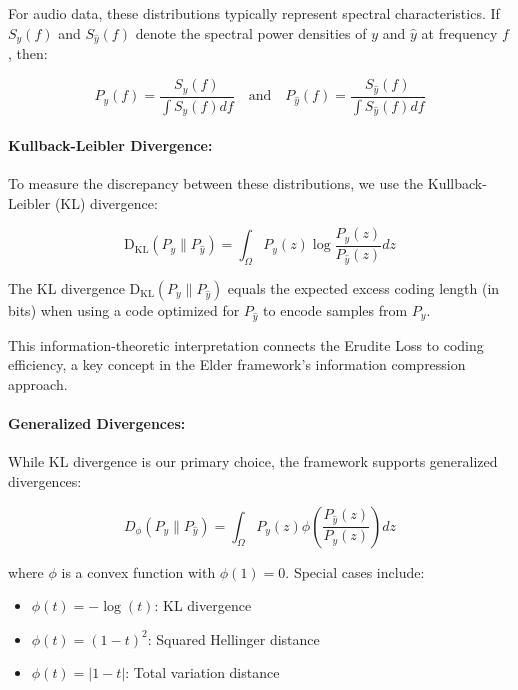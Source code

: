For audio data, these distributions typically represent spectral characteristics. If $S_y(f)$ and $S_{\hat{y}}(f)$ denote the spectral power densities of $y$ and $\hat{y}$ at frequency $f$, then:

\begin{equation}
P_y(f) = \frac{S_y(f)}{\int S_y(f) df} \quad \text{and} \quad P_{\hat{y}}(f) = \frac{S_{\hat{y}}(f)}{\int S_{\hat{y}}(f) df}
\end{equation}

\paragraph{Kullback-Leibler Divergence:}
To measure the discrepancy between these distributions, we use the Kullback-Leibler (KL) divergence:

\begin{equation}
\mathrm{D_{KL}}(P_y \| P_{\hat{y}}) = \int_{\Omega} P_y(z) \log\frac{P_y(z)}{P_{\hat{y}}(z)} dz
\end{equation}

\begin{theorem}
The KL divergence $\mathrm{D_{KL}}(P_y \| P_{\hat{y}})$ equals the expected excess coding length (in bits) when using a code optimized for $P_{\hat{y}}$ to encode samples from $P_y$.
\end{theorem}

This information-theoretic interpretation connects the Erudite Loss to coding efficiency, a key concept in the Elder framework's information compression approach.

\paragraph{Generalized Divergences:}
While KL divergence is our primary choice, the framework supports generalized divergences:

\begin{equation}
D_{\phi}(P_y \| P_{\hat{y}}) = \int_{\Omega} P_y(z) \phi\left(\frac{P_{\hat{y}}(z)}{P_y(z)}\right) dz
\end{equation}

where $\phi$ is a convex function with $\phi(1) = 0$. Special cases include:
\begin{itemize}
\item $\phi(t) = -\log(t)$: KL divergence
\item $\phi(t) = (1-t)^2$: Squared Hellinger distance
\item $\phi(t) = |1-t|$: Total variation distance
\end{itemize}

